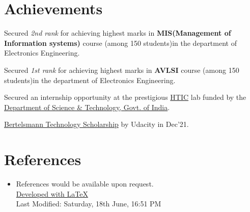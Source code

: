 \documentclass[a4paper,20pt]{article}
\newcommand{\resumeSubHeadingListStart}{\begin{itemize}[leftmargin=*]}
\newcommand{\resumeSubHeadingListEnd}{\end{itemize}}
\begin{document}
\section{Achievements}
\begin{description}[font=$\bullet$]
\item{Secured \textit{2nd rank} for achieving highest marks in \textbf{MIS(Management of Information systems)} course (among 150 students)in the department of Electronics Engineering.}
\item{Secured \textit{1st rank} for achieving highest marks in \textbf{AVLSI} course (among 150 students)in the department of Electronics Engineering.}
\item{Secured an internship opportunity at the prestigious \href{http://hticlab.org/htic/}{HTIC} lab funded by the \href{https://dst.gov.in/}{Department of Science \& Technology, Govt. of India}.}
\item{\href{https://www.udacity.com/bertelsmann-tech-scholarships}{Bertelsmann Technology Scholarship} by Udacity in Dec'21.}

\end{description}
\vspace{2pt}

\section{References}
  \resumeSubHeadingListStart
   \item References would be available upon request.\\
   \vspace{450 pt}
   {\href{https://raw.githubusercontent.com/addy1997/CV/main/Adwait_CV.tex}{Developed with \LaTeX}} \\
   {Last Modified: Saturday, 18th June, 16:51 PM}
  \resumeSubHeadingListEnd
\end{document}
